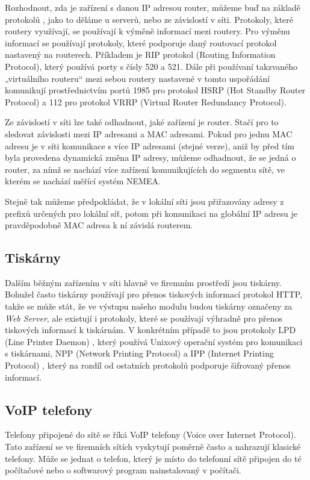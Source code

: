 \documentclass[thesis=B,czech,hidelinks]{FITthesis}[2019/03/21]
\begin{document}
        Rozhodnout, zda je zařízení s danou IP adresou router, můžeme buď na základě protokolů \cite{IANA}, jako to děláme u serverů, nebo ze závislostí v síti. Protokoly, které routery využívají, se používají k výměně informací mezi routery. Pro výměnu informací se používají protokoly, které podporuje daný routovací protokol nastavený na routerech. Příkladem je RIP protokol (Routing Information Protocol), který používá porty s čísly 520 a 521. Dále při používaní takzvaného „virtuálního routeru“  mezi sebou routery nastavené v tomto uspořádání komunikují prostřednictvím portů 1985 pro protokol HSRP (Hot Standby Router Protocol) a 112 pro protokol VRRP (Virtual Router Redundancy Protocol). 
        
        Ze závislostí v síti lze také odhadnout, jaké zařízení je router. Stačí pro to sledovat závislosti mezi IP adresami a MAC adresami. Pokud pro jednu MAC adresu je v síti komunikace s více IP adresami (stejné verze), aniž by před tím byla provedena dynamická změna IP adresy, můžeme odhadnout, že se jedná o router, za nímž se nachází více zařízení komunikujících do segmentu sítě, ve kterém se nachází měřící systém NEMEA. 
        
        Stejně tak můžeme předpokládat, že v lokální síti jsou přiřazovány adresy z prefixů určených pro lokální síť, potom při komunikaci na globální IP adresu je pravděpodobně MAC adresa k ní závislá routerem.
        \subsection{Tiskárny}
        Dalším běžným zařízením v síti hlavně ve firemním prostředí jsou tiskárny. Bohužel často tiskárny používají pro přenos tiskových informací protokol HTTP, takže se může stát, že ve výstupu našeho modulu budou tiskárny označeny za \emph{Web Server}, ale existují i protokoly, které se používají výhradně pro přenos tiskových informací k tiskárnám. V konkrétním případě to jsou protokoly LPD (Line Printer Daemon) \cite{PrinterLPD}, který používá Unixový operační systém pro komunikaci s tiskárnami, NPP (Network Printing Protocol) a IPP (Internet Printing Protocol) \cite{PrinterIPP}, který na rozdíl od ostatních protokolů podporuje šifrovaný přenos informací. 
        \subsection{VoIP telefony}
        Telefony připojené do sítě se říká VoIP telefony (Voice over Internet Protocol). Tato zařízení se ve firemních sítích vyskytují poměrně často a nahrazují klasické telefony. Může se jednat o telefon, který je místo do telefonní sítě připojen do té počítačové nebo o softwarový program nainstalovaný v počítači. 
        
\end{document}
